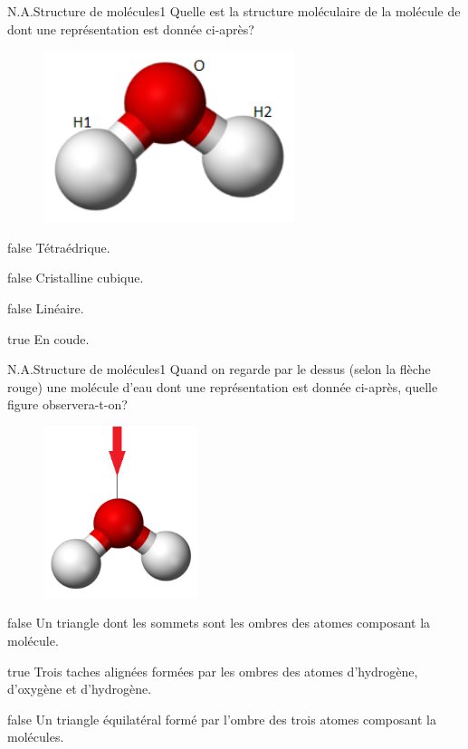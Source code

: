 		\begin{question}{N.A.}{Structure de molécules}{1}{}
			Quelle est la structure moléculaire de la molécule de  dont une représentation est donnée ci-après?
			\begin{figure}
				\centering
				\includegraphics[height = 5cm]{Antoine/Figures_Antoine/240px-Water-3D-balls.png}
			\end{figure}
		\end{question}
		\begin{reponses}
			\item[false] Tétraédrique.
			\item[false] Cristalline cubique.
			\item[false] Linéaire.
			\item[true] En coude.
		\end{reponses}
		\begin{question}{N.A.}{Structure de molécules}{1}{}
			Quand on regarde par le dessus (selon la flèche rouge) une molécule d'eau  dont une représentation est donnée ci-après, quelle figure observera-t-on?
			\begin{figure}
				\centering
				\includegraphics[height = 5cm]{Antoine/Figures_Antoine/240px-Water-3D-balls3.png}
			\end{figure}
		\end{question}
		\begin{reponses}
			\item[false] Un triangle dont les sommets sont les ombres des atomes composant la molécule.
			\item[true] Trois taches alignées formées par les ombres des atomes d'hydrogène, d'oxygène et d'hydrogène.
			\item[false] Un triangle équilatéral formé par l'ombre des trois atomes composant la molécules.
		\end{reponses}
